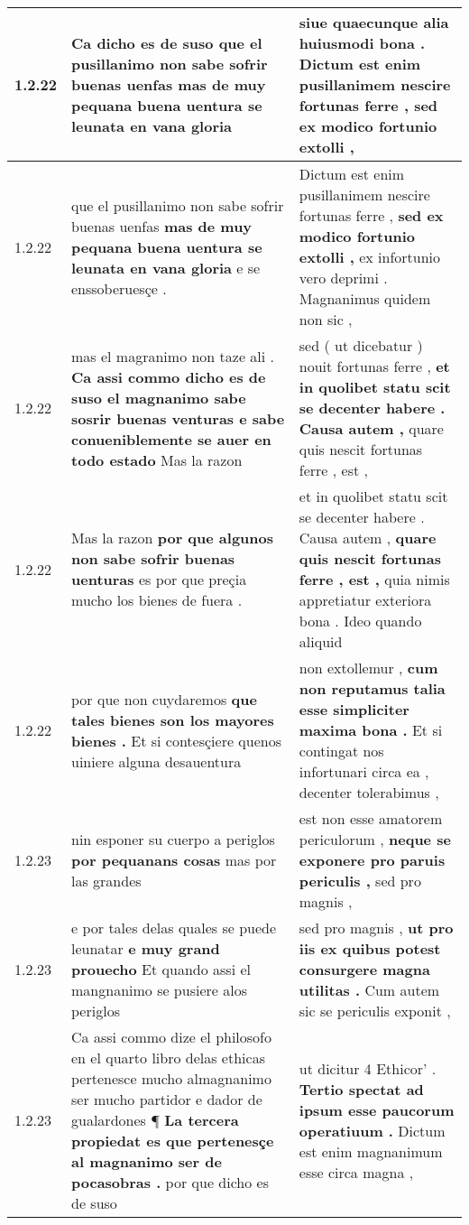 \begin{tabular}{|p{1cm}|p{6.5cm}|p{6.5cm}|}
1.2.22 & Ca dicho es de suso \textbf{ que el pusillanimo non sabe sofrir buenas uenfas } mas de muy pequana buena uentura se leunata en vana gloria & siue quaecunque alia huiusmodi bona . \textbf{ Dictum est enim pusillanimem nescire fortunas ferre , } sed ex modico fortunio extolli , \\\hline
1.2.22 & que el pusillanimo non sabe sofrir buenas uenfas \textbf{ mas de muy pequana buena uentura se leunata en vana gloria } e se enssoberuesçe . & Dictum est enim pusillanimem nescire fortunas ferre , \textbf{ sed ex modico fortunio extolli , } ex infortunio vero deprimi . Magnanimus quidem non sic , \\\hline
1.2.22 & mas el magranimo non taze ali . \textbf{ Ca assi commo dicho es de suso el magnanimo sabe sosrir buenas venturas e sabe conueniblemente se auer en todo estado } Mas la razon & sed ( ut dicebatur ) nouit fortunas ferre , \textbf{ et in quolibet statu scit se decenter habere . Causa autem , } quare quis nescit fortunas ferre , est , \\\hline
1.2.22 & Mas la razon \textbf{ por que algunos non sabe sofrir buenas uenturas } es por que preçia mucho los bienes de fuera . & et in quolibet statu scit se decenter habere . Causa autem , \textbf{ quare quis nescit fortunas ferre , est , } quia nimis appretiatur exteriora bona . Ideo quando aliquid \\\hline
1.2.22 & por que non cuydaremos \textbf{ que tales bienes son los mayores bienes . } Et si contesçiere quenos uiniere alguna desauentura & non extollemur , \textbf{ cum non reputamus talia esse simpliciter maxima bona . } Et si contingat nos infortunari circa ea , decenter tolerabimus , \\\hline
1.2.23 & nin esponer su cuerpo a periglos \textbf{ por pequanans cosas } mas por las grandes & est non esse amatorem periculorum , \textbf{ neque se exponere pro paruis periculis , } sed pro magnis , \\\hline
1.2.23 & e por tales delas quales se puede leunatar \textbf{ e muy grand prouecho } Et quando assi el mangnanimo se pusiere alos periglos & sed pro magnis , \textbf{ ut pro iis ex quibus potest consurgere magna utilitas . } Cum autem sic se periculis exponit , \\\hline
1.2.23 & Ca assi commo dize el philosofo en el quarto libro delas ethicas pertenesce mucho almagnanimo ser mucho partidor e dador de gualardones ¶ \textbf{ La tercera propiedat es que pertenesçe al magnanimo ser de pocasobras . } por que dicho es de suso & ut dicitur 4 Ethicor’ . \textbf{ Tertio spectat ad ipsum esse paucorum operatiuum . } Dictum est enim magnanimum esse circa magna , \\\hline

\end{tabular}
